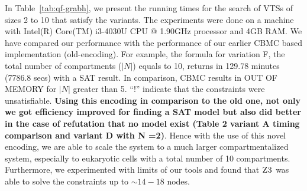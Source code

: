 


In Table~\ref{tab:qf-grabh}, we present the running times for the search of
VTSs of sizes 2 to 10 that satisfy the variants.
%
The experiments were done on a machine with Intel(R) Core(TM) i3-4030U
CPU @ 1.90GHz processor and 4GB RAM.
%
We have compared our performance with the performance of our earlier 
CBMC based implementation (old-encoding).
%
For example, the formula for variation F, the total number of
compartments ($|N|$) equals to 10, returns in 129.78 minutes (7786.8 secs)
with a SAT result.
%
In comparison, CBMC results in OUT OF MEMORY for $|N|$ greater than 5.
%
``!'' indicate that the constraints were unsatisfiable.
%
 \textbf{Using this encoding in comparison to the old one, not only we got efficiency improved for finding a SAT model but also did better in the case of refutation that no model exist (Table 2 variant A timing comparison and variant D with N =2)}. Hence with the use of this novel encoding, we are able to scale the system to a much larger compartmentalized system, especially to
eukaryotic cells with a total number of 10 compartments.
%
%
Furthermore, we experimented with limits of our tools and found
that $\textsc{Z3}$ was able to solve the constraints up to $\sim{14-18}$ nodes.



% 






